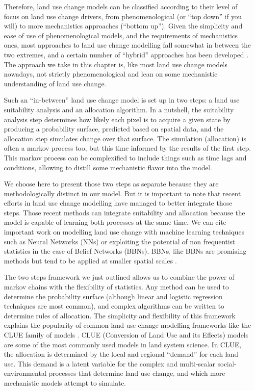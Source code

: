 Therefore, land use change models can be classified according to their level of focus on land use change drivers, from phenomenological (or “top down” if you will) to more mechanistics approaches (“bottom up”). Given the simplicity and ease of use of phenomenological models, and the requirements of mechanistics ones, most approaches to land use change modelling fall somewhat in between the two extremes, and a certain number of “hybrid” approaches has been developed \citep{sun_comparison_2018, jokar_arsanjani_integration_2013}. The approach we take in this chapter is, like most land use change models nowadays, not strictly phenomenological and lean on some mechanistic understanding of land use change.

Such an “in-between” land use change model is set up in two steps: a land use suitability analysis and an allocation algorithm. In a nutshell, the suitability analysis step determines how likely each pixel is to acquire a given state by producing a probability surface, predicted based on spatial data, and the allocation step simulates change over that surface. The simulation (allocation) is often a markov process too, but this time informed by the results of the first step. This markov process can be complexified to include things such as time lags and conditions, allowing to distill some mechanistic flavor into the model.

We choose here to present those two steps as separate because they are methodologically distinct in our model. But it is important to note that recent efforts in land use change modelling have managed to better integrate those steps. Those recent methods can integrate suitability and allocation because the model is capable of learning both processes at the same time. We can cite important work on modelling land use change with machine learning techniques such as Neural Networks (NNs) \citep{tayyebi_simulating_2013} or exploiting the potential of non frequentist statistics in the case of Belief Networks (BBNs). BBNs, like BBNs are promising methods but tend to be applied at smaller spatial scales \citep{celio_modeling_2014}.

The two steps framework we just outlined allows us to combine the power of markov chains with the flexibility of statistics. Any method can be used to determine the probability surface (although linear and logistic regression techniques are most common), and complex algorithms can be written to determine rules of allocation. The simplicity and flexibility of this framework explains the popularity of common land use change modelling frameworks like the CLUE family of models \citep{verburg_modeling_2002, verburg_combining_2009}. CLUE (Conversion of Land Use and its Effects) models are some of the most commonly used models in land system science. In CLUE, the allocation is determined by the local and regional “demand” for each land use. This demand is a latent variable for the complex and multi-scalar social-environmental processes that determine land use change, and which more mechanistic models attempt to simulate.

